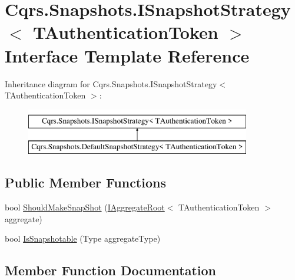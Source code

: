 \hypertarget{interfaceCqrs_1_1Snapshots_1_1ISnapshotStrategy}{}\section{Cqrs.\+Snapshots.\+I\+Snapshot\+Strategy$<$ T\+Authentication\+Token $>$ Interface Template Reference}
\label{interfaceCqrs_1_1Snapshots_1_1ISnapshotStrategy}
Inheritance diagram for Cqrs.\+Snapshots.\+I\+Snapshot\+Strategy$<$ T\+Authentication\+Token $>$\+:\begin{figure}[H]
\begin{center}
\leavevmode
\includegraphics[height=2.000000cm]{interfaceCqrs_1_1Snapshots_1_1ISnapshotStrategy}
\end{center}
\end{figure}
\subsection*{Public Member Functions}
\begin{DoxyCompactItemize}
\item 
bool \hyperlink{interfaceCqrs_1_1Snapshots_1_1ISnapshotStrategy_ab1d54cd76c7ac832329cb3a6de0effcd_ab1d54cd76c7ac832329cb3a6de0effcd}{Should\+Make\+Snap\+Shot} (\hyperlink{interfaceCqrs_1_1Domain_1_1IAggregateRoot}{I\+Aggregate\+Root}$<$ T\+Authentication\+Token $>$ aggregate)
\item 
bool \hyperlink{interfaceCqrs_1_1Snapshots_1_1ISnapshotStrategy_a02121821312c4ce2811b31eeaffabe51_a02121821312c4ce2811b31eeaffabe51}{Is\+Snapshotable} (Type aggregate\+Type)
\end{DoxyCompactItemize}


\subsection{Member Function Documentation}
\mbox{\label{interfaceCqrs_1_1Snapshots_1_1ISnapshotStrategy_a02121821312c4ce2811b31eeaffabe51_a02121821312c4ce2811b31eeaffabe51}} 
